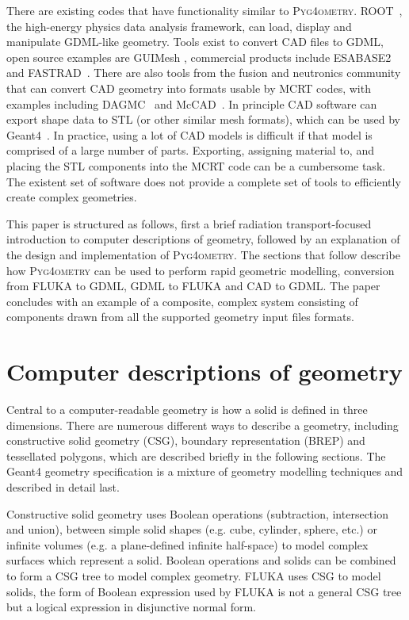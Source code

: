 \documentclass[final,5p,times,twocolumn]{elsarticle}
\newcommand{\PYGEOMETRY}{\textsc{Pyg4ometry}}
\begin{document}
There are existing codes that have functionality similar to \PYGEOMETRY{}. ROOT~\cite{Brun:1997pa}, the high-energy physics data analysis framework, 
can load, display and manipulate GDML-like geometry. Tools exist to convert CAD files to GDML, open source examples are GUIMesh \cite{GUIMesh_Pinto}, commercial 
products include ESABASE2~\cite{ESABASE2} and FASTRAD~\cite{FASTRAD}. There are also tools from the fusion and neutronics community that can convert CAD 
geometry into formats usable by MCRT codes, with examples including DAGMC~\cite{DAGMC} and McCAD~\cite{McCad}. In principle CAD software can export shape data to STL 
(or other similar mesh formats), which can be used by Geant4~\cite{poole2012acad}. In practice, using a lot of CAD models is difficult if that model is comprised of a 
large number of parts. Exporting, assigning material to, and placing the STL components into the MCRT code can be a cumbersome task. The existent set of software does not 
provide a complete set of tools to efficiently create complex geometries.

This paper is structured as follows, first a brief radiation transport-focused introduction to computer descriptions of geometry, followed by an explanation of the design 
and implementation of \PYGEOMETRY{}. The sections that follow describe how \PYGEOMETRY{} can be used to perform rapid geometric modelling, conversion from 
FLUKA to GDML, GDML to FLUKA and CAD to GDML. The paper concludes with an example of a composite, complex system consisting of components drawn from 
all the supported  geometry input files formats.

\section{Computer descriptions of geometry} \label{sec:geometric}
Central to a computer-readable geometry is how a solid is defined in three dimensions. There are numerous different ways to describe a
geometry, including constructive solid geometry (CSG), boundary representation (BREP) and tessellated polygons, which are described 
briefly in the following sections.  The Geant4 geometry specification is a mixture of geometry modelling techniques and described in detail last.

Constructive solid geometry uses Boolean operations (subtraction, intersection and union), between simple solid shapes (e.g. cube, cylinder, sphere, etc.) or infinite
volumes (e.g. a plane-defined infinite half-space) to model complex surfaces which represent a solid. Boolean operations and solids can be combined to form a 
CSG tree to model complex geometry. FLUKA uses CSG to model solids, the form of Boolean expression used by FLUKA is not a general CSG tree but a 
logical expression in disjunctive normal form.
\end{document}
